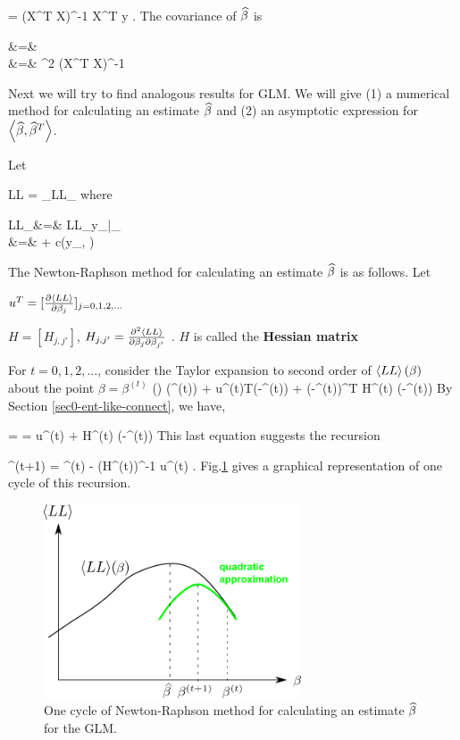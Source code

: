 \beq
\HAT{\beta}=
(X^T X)^{-1} X^T y
\;.
\eeq
The covariance of $\widehat{\beta}$ is

\beqa
{}
&=&
\\
&=&
\s^2  (X^T X)^{-1}
\eeqa

Next
we will try to find analogous results for GLM.
We will give (1) a numerical method
for calculating an estimate
$\widehat{\beta}$
and (2) an asymptotic
expression for
$\left\langle\widehat{\beta}, \widehat{\beta}^T\right\rangle$.

Let

\beq
 LL =  \sum_\s  LL_\s
\eeq
where

\beqa
 LL_\s &=&   LL_{y_\s|\theta_\s }
\\
&=&
 + c(y_\s, \phi)
\eeqa

The
Newton-Raphson method for calculating an
estimate $\widehat{\beta}$ is as follows. Let

$u^T = [\frac{\partial\left\langle LL\right\rangle}{\partial\beta_j}]_{j=0,1,2, \ldots}$

 $H= [H_{j, j'}]$, $H_{j, j'} =
\frac{\partial^2 \left\langle LL\right\rangle }{\partial\beta_j\partial\beta_{j'}}$ .
$H$ is called the {\bf Hessian matrix}

For $t=0, 1, 2,\ldots$, consider the
Taylor expansion  to second order
of $\left\langle LL\right\rangle(\beta)$  about  the
point $\beta= \beta^{(t)}$
\beq
{}(\beta)
\approx
{}(\beta^{(t)})
+ u^{(t)T}(\beta-\beta^{(t)})
+ 
(\beta-\beta^{(t)})^T H^{(t)} (\beta-\beta^{(t)})
\eeq
 By Section \ref{sec0-ent-like-connect}, we have,

 =
=
u^{(t)}
+
H^{(t)} (\beta-\beta^{(t)})
\eeq
This last equation suggests the recursion

\beq
\beta^{(t+1)} =
\beta^{(t)} -  (H^{(t)})^{-1} u^{(t)}
\;.
\eeq
Fig.\ref{fig-gml-new-rap}
gives a graphical
representation of
one cycle of this recursion.


\begin{figure}[h!]
\centering
\includegraphics[width=3in]
{gen-lin-mod/gen-lin-mod.png}
\caption{One cycle of Newton-Raphson method
for calculating an estimate $\widehat{\beta}$ for the GLM.}
\label{fig-gml-new-rap}
\end{figure}





